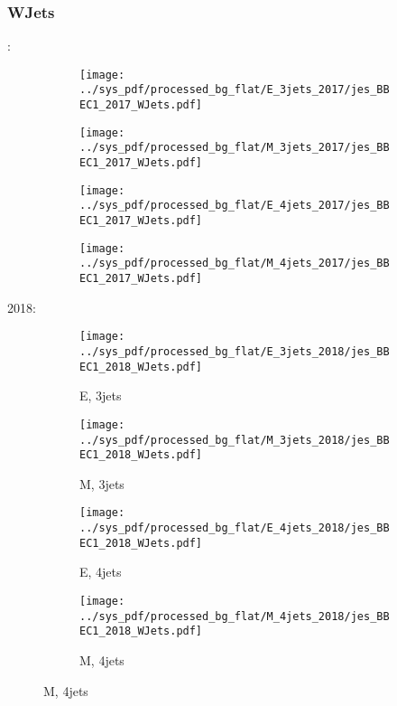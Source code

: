 \documentclass{beamer}
\begin{document}
\begin{frame}
\frametitle{WJets}
\fontsize{5}{1}:
\begin{figure}
\centering
\begin{subfigure}[b]{0.24\textwidth}
\texttt{[image: ../sys\_pdf/processed\_bg\_flat/E\_3jets\_2017/jes\_BBEC1\_2017\_WJets.pdf]}
\end{subfigure}
\begin{subfigure}[b]{0.24\textwidth}
\texttt{[image: ../sys\_pdf/processed\_bg\_flat/M\_3jets\_2017/jes\_BBEC1\_2017\_WJets.pdf]}
\end{subfigure}
\begin{subfigure}[b]{0.24\textwidth}
\texttt{[image: ../sys\_pdf/processed\_bg\_flat/E\_4jets\_2017/jes\_BBEC1\_2017\_WJets.pdf]}
\end{subfigure}
\begin{subfigure}[b]{0.24\textwidth}
\texttt{[image: ../sys\_pdf/processed\_bg\_flat/M\_4jets\_2017/jes\_BBEC1\_2017\_WJets.pdf]}
\end{subfigure}
\end{figure}
2018:
\begin{figure}
\centering
\begin{subfigure}[b]{0.24\textwidth}
\texttt{[image: ../sys\_pdf/processed\_bg\_flat/E\_3jets\_2018/jes\_BBEC1\_2018\_WJets.pdf]}
\captionsetup{font=tiny}
\caption{E, 3jets}
\end{subfigure}
\begin{subfigure}[b]{0.24\textwidth}
\texttt{[image: ../sys\_pdf/processed\_bg\_flat/M\_3jets\_2018/jes\_BBEC1\_2018\_WJets.pdf]}
\captionsetup{font=tiny}
\caption{M, 3jets}
\end{subfigure}
\begin{subfigure}[b]{0.24\textwidth}
\texttt{[image: ../sys\_pdf/processed\_bg\_flat/E\_4jets\_2018/jes\_BBEC1\_2018\_WJets.pdf]}
\captionsetup{font=tiny}
\caption{E, 4jets}
\end{subfigure}
\begin{subfigure}[b]{0.24\textwidth}
\texttt{[image: ../sys\_pdf/processed\_bg\_flat/M\_4jets\_2018/jes\_BBEC1\_2018\_WJets.pdf]}
\captionsetup{font=tiny}
\caption{M, 4jets}
\end{subfigure}
\end{figure}
\end{frame}
\end{document}
